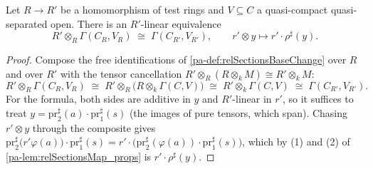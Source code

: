 \begin{theorem}
  \label{pa-thm:relTermBaseChange}
  \leanok

  Let \(R \to R'\) be a homomorphism of test rings and \(V \subseteq C\) a quasi-compact
  quasi-separated open. There is an \(R'\)-linear equivalence
  \[
    R' \otimes_R \Gamma(C_R, V_R) \;\cong\; \Gamma(C_{R'}, V_{R'}), \qquad
    r' \otimes y \longmapsto r' \cdot \rho^{\sharp}(y) .
  \]
\end{theorem}
\begin{proof}
  \leanok
  Compose the free identifications of \ref{pa-def:relSectionsBaseChange} over \(R\) and
  over \(R'\) with the tensor cancellation
  \(R' \otimes_R (R \otimes_k M) \cong R' \otimes_k M\):
  \[
    R' \otimes_R \Gamma(C_R, V_R) \;\cong\; R' \otimes_R \bigl(R \otimes_k \Gamma(C, V)\bigr)
      \;\cong\; R' \otimes_k \Gamma(C, V) \;\cong\; \Gamma(C_{R'}, V_{R'}) .
  \]
  For the formula, both sides are additive in \(y\) and \(R'\)-linear in \(r'\), so it
  suffices to treat \(y = \mathrm{pr}_2^{\sharp}(a) \cdot \mathrm{pr}_1^{\sharp}(s)\)
  (the images of pure tensors, which span). Chasing \(r' \otimes y\) through the
  composite gives \(\mathrm{pr}_2^{\sharp}\bigl(r' \varphi(a)\bigr) \cdot
  \mathrm{pr}_1^{\sharp}(s) = r' \cdot \bigl(\mathrm{pr}_2^{\sharp}(\varphi(a)) \cdot
  \mathrm{pr}_1^{\sharp}(s)\bigr)\), which by (1) and (2) of
  \ref{pa-lem:relSectionsMap_props} is \(r' \cdot \rho^{\sharp}(y)\).
\end{proof}

